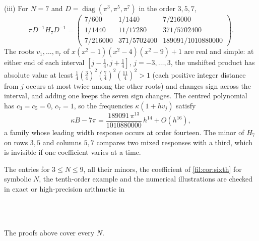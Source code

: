 \begin{example}
(iii) For $N=7$ and $D=\operatorname{diag}(\pi^3,\pi^5,\pi^7)$ in the order $3,5,7$,
\[
 \pi D^{-1}H_7D^{-1}=
 \begin{pmatrix}
 7/600&1/1440&7/216000\\
 1/1440&11/17280&371/5702400\\
 7/216000&371/5702400&189091/1010880000
 \end{pmatrix}.
\]
The roots $v_1,\dots,v_7$ of $x(x^2-1)(x^2-4)(x^2-9)+1$ are real and simple: at either end of each interval
$[j-\tfrac14,j+\tfrac14]$, $j=-3,\dots,3$, the unshifted product has absolute value at least
$\tfrac14(\tfrac34)^2(\tfrac74)^2(\tfrac{11}4)^2>1$ (each positive integer distance from $j$ occurs at most twice among the other
roots) and changes sign across the interval, and adding one keeps the seven sign changes. The centred polynomial
has $c_3=c_5=0$, $c_7=1$, so the frequencies $\kappa(1+hv_j)$ satisfy
\[
 \kappa B-7\pi=\frac{189091\,\pi^{13}}{1010880000}\,h^{14}+O(h^{16}),
\]
a family whose leading width response occurs at order fourteen. The minor of $H_7$ on rows $3,5$ and columns $5,7$
compares two mixed responses with a third, which is invisible if one coefficient varies at a time.
\end{example}

The entries for $3\le N\le9$, all their minors, the coefficient of \cref{fil:cor:sixth} for symbolic $N$, the
tenth-order example and the numerical illustrations are checked in exact or high-precision arithmetic in
\begin{center}\small
{}\\
\\
\end{center}
The proofs above cover every $N$.

